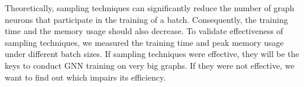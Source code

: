 \begin{itemize}
          Theoretically, sampling techniques can significantly reduce the number of graph neurons that participate in the training of a batch.
          Consequently, the training time and the memory usage should also decrease.
          To validate effectiveness of sampling techniques, we measured the training time and peak memory usage under different batch sizes.
          If sampling techniques were effective, they will be the keys to conduct GNN training on very big graphs.
          If they were not effective, we want to find out which impairs its efficiency.
\end{itemize}